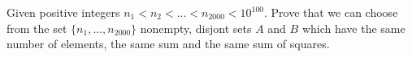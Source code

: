Given positive integers $n_1<n_2<...<n_{2000}<10^{100}$. Prove that we can choose from the set $\{n_1,...,n_{2000}\}$  nonempty, disjont sets $A$ and $B$ which have the same number of elements, the same sum and the same sum of squares.